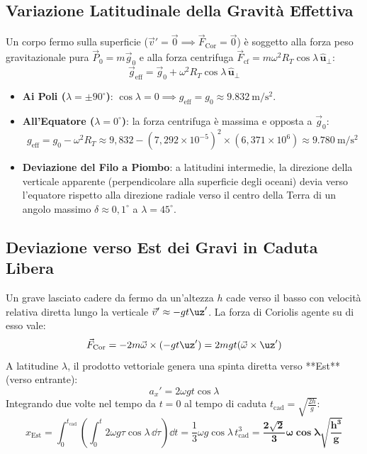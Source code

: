 \subsection{Variazione Latitudinale della Gravità Effettiva}
Un corpo fermo sulla superficie ($\vec{v}' = \vec{0} \implies \vec{F}_{\text{Cor}} = \vec{0}$) è soggetto alla forza peso gravitazionale pura $\vec{P}_0 = m\vec{g}_0$ e alla forza centrifuga $\vec{F}_{\text{cf}} = m\omega^2 R_T \cos\lambda\,\hat{\bm{u}}_\perp$:
\begin{equation}
    \vec{g}_{\text{eff}} = \vec{g}_0 + \omega^2 R_T\cos\lambda\,\hat{\bm{u}}_\perp
\end{equation}
\begin{itemize}
    \item \textbf{Ai Poli ($\lambda = \pm 90^\circ$)}: $\cos\lambda = 0 \implies g_{\text{eff}} = g_0 \approx \SI{9.832}{\metre\per\second\squared}$.
    \item \textbf{All'Equatore ($\lambda = 0^\circ$)}: la forza centrifuga è massima e opposta a $\vec{g}_0$:
    \begin{equation}
        g_{\text{eff}} = g_0 - \omega^2 R_T \approx 9{,}832 - (7{,}292\times 10^{-5})^2 \times (6{,}371\times 10^6) \approx \SI{9.780}{\metre\per\second\squared}
    \end{equation}
    \item \textbf{Deviazione del Filo a Piombo}: a latitudini intermedie, la direzione della verticale apparente (perpendicolare alla superficie degli oceani) devia verso l'equatore rispetto alla direzione radiale verso il centro della Terra di un angolo massimo $\delta \approx 0{,}1^\circ$ a $\lambda = 45^\circ$.
\end{itemize}

\subsection{Deviazione verso Est dei Gravi in Caduta Libera}
Un grave lasciato cadere da fermo da un'altezza $h$ cade verso il basso con velocità relativa diretta lungo la verticale $\vec{v}' \approx -g t\uz'$. La forza di Coriolis agente su di esso vale:
\begin{equation}
    \vec{F}_{\text{Cor}} = -2m\vec{\omega}\times(-gt\uz') = 2mg t (\vec{\omega}\times\uz')
\end{equation}
A latitudine $\lambda$, il prodotto vettoriale genera una spinta diretta verso **Est** (verso entrante):
\begin{equation}
    a_x' = 2\omega g t \cos\lambda
\end{equation}
Integrando due volte nel tempo da $t=0$ al tempo di caduta $t_{\text{cad}} = \sqrt{\frac{2h}{g}}$:
\begin{equation}
    x_{\text{Est}} = \int_0^{t_{\text{cad}}} \left(\int_0^t 2\omega g \tau \cos\lambda\,\dd\tau\right)\dd t = \frac{1}{3}\omega g \cos\lambda\,t_{\text{cad}}^3 = \mathbf{\frac{2\sqrt{2}}{3}\omega\cos\lambda \sqrt{\frac{h^3}{g}}}
    \label{eq:deviazione_est}
\end{equation}

